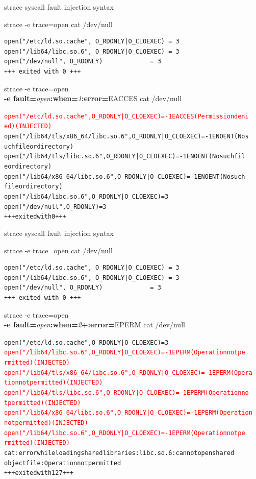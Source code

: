 \documentclass[unicode]{beamer}
\begin{document}
\begin{frame}[fragile]{strace syscall fault injection syntax}
\scriptsize
\begin{block}{\large strace -e trace=open cat /dev/null}
\begin{verbatim}
open("/etc/ld.so.cache", O_RDONLY|O_CLOEXEC) = 3
open("/lib64/libc.so.6", O_RDONLY|O_CLOEXEC) = 3
open("/dev/null", O_RDONLY)             = 3
+++ exited with 0 +++
\end{verbatim}
\end{block}
\begin{block}{\large strace -e trace=open \\ {\bf -e fault=}{\it open}{\bf :when=}{\it 1}{\bf :error=}{\sc EACCES} cat /dev/null}
\begin{alltt}
\textcolor{red}{open("/etc/ld.so.cache", O_RDONLY|O_CLOEXEC) = -1 EACCES (Permission deni
ed) (INJECTED)}
open("/lib64/tls/x86_64/libc.so.6", O_RDONLY|O_CLOEXEC) = -1 ENOENT (No s
uch file or directory)
open("/lib64/tls/libc.so.6", O_RDONLY|O_CLOEXEC) = -1 ENOENT (No such fil
e or directory)
open("/lib64/x86_64/libc.so.6", O_RDONLY|O_CLOEXEC) = -1 ENOENT (No such
file or directory)
open("/lib64/libc.so.6", O_RDONLY|O_CLOEXEC) = 3
open("/dev/null", O_RDONLY)             = 3
+++ exited with 0 +++
\end{alltt}
\end{block}
\end{frame}

\begin{frame}[fragile]{strace syscall fault injection syntax}
\scriptsize
\begin{block}{\large strace -e trace=open cat /dev/null}
\begin{verbatim}
open("/etc/ld.so.cache", O_RDONLY|O_CLOEXEC) = 3
open("/lib64/libc.so.6", O_RDONLY|O_CLOEXEC) = 3
open("/dev/null", O_RDONLY)             = 3
+++ exited with 0 +++
\end{verbatim}
\end{block}
\begin{block}{\large strace -e trace=open \\ {\bf -e fault=}{\it open}{\bf :when=}{\it 2}{\bf +:error=}{\sc EPERM} cat /dev/null}
\begin{alltt}
open("/etc/ld.so.cache", O_RDONLY|O_CLOEXEC) = 3
\textcolor{red}{open("/lib64/libc.so.6", O_RDONLY|O_CLOEXEC) = -1 EPERM (Operation not pe
rmitted) (INJECTED)}
\textcolor{red}{open("/lib64/tls/x86_64/libc.so.6", O_RDONLY|O_CLOEXEC) = -1 EPERM (Opera
tion not permitted) (INJECTED)}
\textcolor{red}{open("/lib64/tls/libc.so.6", O_RDONLY|O_CLOEXEC) = -1 EPERM (Operation no
t permitted) (INJECTED)}
\textcolor{red}{open("/lib64/x86_64/libc.so.6", O_RDONLY|O_CLOEXEC) = -1 EPERM (Operation
not permitted) (INJECTED)}
\textcolor{red}{open("/lib64/libc.so.6", O_RDONLY|O_CLOEXEC) = -1 EPERM (Operation not pe
rmitted) (INJECTED)}
cat: error while loading shared libraries: libc.so.6: cannot open shared
object file: Operation not permitted
+++ exited with 127 +++
\end{alltt}
\end{block}
\end{frame}
\end{document}
